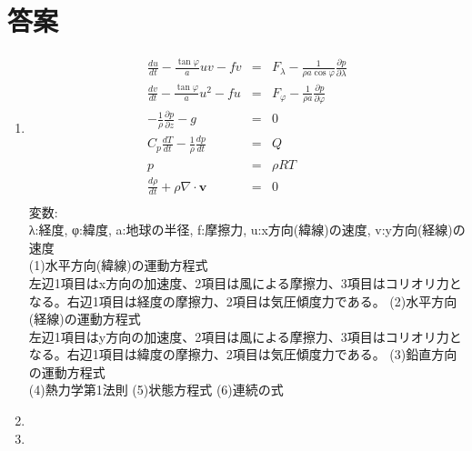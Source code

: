 \documentclass{jsarticle}
\newenvironment{problems}
{
  \renewcommand\labelenumi{\doublebox{\arabic{enumi}}}
  \begin{enumerate}
}{
  \end{enumerate}
  \renewcommand\labelenumi{\arabic{enumi}.}
}
\begin{document}
\section{答案}
\begin{problems}
\item
    \begin{eqnarray}
    \frac{du}{dt}-\frac{\tan\varphi}{a}uv -fv &=& F_{\lambda} - \frac{1}{\rho a \cos\varphi}\frac{\partial p}{\partial \lambda}\\
    \frac{dv}{dt}-\frac{\tan\varphi}{a}u^2 -fu &=& F_{\varphi} - \frac{1}{\rho  a}\frac{\partial p}{\partial \varphi}\\
    -\frac{1}{\rho}\frac{\partial p}{\partial z}-g &=& 0\\
    C_p\frac{dT}{dt}-\frac{1}{\rho}\frac{dp}{dt} &=& Q\\
    p &=& \rho R T\\
    \frac{d\rho}{dt} + \rho\nabla\cdot \bm{v}&=& 0\\
    \end{eqnarray}
  変数:\\  λ:経度, φ:緯度, a:地球の半径, f:摩擦力, u:x方向(緯線)の速度, v:y方向(経線)の速度\\
(1)水平方向(緯線)の運動方程式\\
左辺1項目はx方向の加速度、2項目は風による摩擦力、3項目はコリオリ力となる。右辺1項目は経度の摩擦力、2項目は気圧傾度力である。
(2)水平方向(経線)の運動方程式\\
左辺1項目はy方向の加速度、2項目は風による摩擦力、3項目はコリオリ力となる。右辺1項目は緯度の摩擦力、2項目は気圧傾度力である。
(3)鉛直方向の運動方程式\\

(4)熱力学第1法則
(5)状態方程式
(6)連続の式


\item 

\item 
\end{problems}
\end{document}
